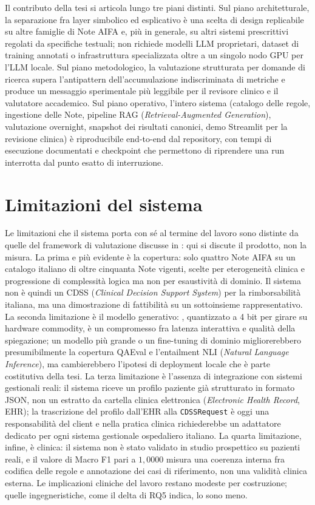 Il contributo della tesi si articola lungo tre piani distinti. Sul piano architetturale, la separazione fra layer simbolico ed esplicativo è una scelta di design replicabile su altre famiglie di Note AIFA e, più in generale, su altri sistemi prescrittivi regolati da specifiche testuali; non richiede modelli LLM proprietari, dataset di training annotati o infrastruttura specializzata oltre a un singolo nodo GPU per l'LLM locale. Sul piano metodologico, la valutazione strutturata per domande di ricerca supera l'antipattern dell'accumulazione indiscriminata di metriche e produce un messaggio sperimentale più leggibile per il revisore clinico e il valutatore accademico. Sul piano operativo, l'intero sistema (catalogo delle regole, ingestione delle Note, pipeline RAG (\emph{Retrieval-Augmented Generation}), valutazione overnight, snapshot dei risultati canonici, demo Streamlit per la revisione clinica) è riproducibile end-to-end dal repository, con tempi di esecuzione documentati e checkpoint che permettono di riprendere una run interrotta dal punto esatto di interruzione.

\section{Limitazioni del sistema}
\label{sec:concl-limitazioni}

Le limitazioni che il sistema porta con sé al termine del lavoro sono distinte da quelle del framework di valutazione discusse in : qui si discute il prodotto, non la misura. La prima e più evidente è la copertura: solo quattro Note AIFA su un catalogo italiano di oltre cinquanta Note vigenti, scelte per eterogeneità clinica e progressione di complessità logica ma non per esaustività di dominio. Il sistema non è quindi un CDSS (\emph{Clinical Decision Support System}) per la rimborsabilità italiana, ma una dimostrazione di fattibilità su un sottoinsieme rappresentativo. La seconda limitazione è il modello generativo: \llmmodel, quantizzato a 4 bit per girare su hardware commodity, è un compromesso fra latenza interattiva e qualità della spiegazione; un modello più grande o un fine-tuning di dominio migliorerebbero presumibilmente la copertura QAEval e l'entailment NLI (\emph{Natural Language Inference}), ma cambierebbero l'ipotesi di deployment locale che è parte costitutiva della tesi. La terza limitazione è l'assenza di integrazione con sistemi gestionali reali: il sistema riceve un profilo paziente già strutturato in formato JSON, non un estratto da cartella clinica elettronica (\emph{Electronic Health Record}, EHR); la trascrizione del profilo dall'EHR alla \texttt{CDSSRequest} è oggi una responsabilità del client e nella pratica clinica richiederebbe un adattatore dedicato per ogni sistema gestionale ospedaliero italiano. La quarta limitazione, infine, è clinica: il sistema non è stato validato in studio prospettico su pazienti reali, e il valore di Macro F1 pari a $1{,}0000$ misura una coerenza interna fra codifica delle regole e annotazione dei casi di riferimento, non una validità clinica esterna. Le implicazioni cliniche del lavoro restano modeste per costruzione; quelle ingegneristiche, come il delta di RQ5 indica, lo sono meno.

